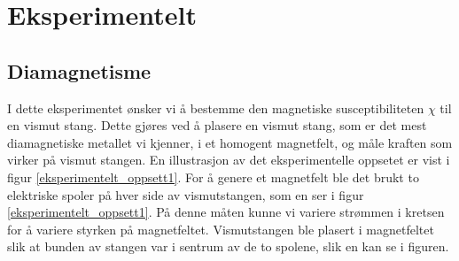 \documentclass[%
 reprint,
 amsmath,amssymb,
 aps,
 norsk,
]{revtex4-1}
\begin{document}
\section{\label{sec:level3}Eksperimentelt}
\subsection{Diamagnetisme}
I dette eksperimentet ønsker vi å bestemme den magnetiske susceptibiliteten $\chi$ til en vismut stang. Dette gjøres ved å plasere en vismut stang, som er det mest diamagnetiske metallet vi kjenner, i et homogent magnetfelt, og måle kraften som virker på vismut stangen. En illustrasjon av det eksperimentelle oppsetet er vist i figur \vref{eksperimentelt_oppsett1}. For å genere et magnetfelt ble det brukt to elektriske spoler på hver side av vismutstangen, som en ser i figur \vref{eksperimentelt_oppsett1}. På denne måten kunne vi variere strømmen i kretsen for å variere styrken på magnetfeltet. Vismutstangen ble plasert i magnetfeltet slik at bunden av stangen var i sentrum av de to spolene, slik en kan se i figuren.
\end{document}
